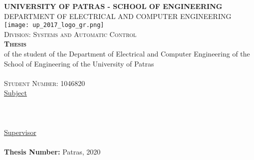 \pagestyle{empty}

\begin{titlepage}
\begin{center}
\textsc{\textbf{\large UNIVERSITY OF PATRAS - SCHOOL OF ENGINEERING}\\
\large DEPARTMENT OF ELECTRICAL AND COMPUTER ENGINEERING}\\

\texttt{[image: up\_2017\_logo\_gr.png]}\\  

\textsc{Division: \large Systems and Automatic Control}\\[1cm]

\textsc{\textbf{\LARGE{Thesis}}}\\ [0.5cm]
of the student of the Department of Electrical and Computer Engineering of the School of Engineering of the University of Patras\\[0.5cm]

\textsc{\Large \me }\\[0.5cm]
\textsc{\large Student Number: 1046820}\\[1cm]

\underline{\large Subject}\\
\HRule \\[0.4cm]
{\huge \bfseries \thesistitle }\\[0.4cm] %
\HRule \\[1.5cm]

\underline{\large Supervisor}\\[0.5cm]
\large \suptitle \, \supname \\[1cm]
\textbf{Thesis Number:}
\vfill
\large{Patras, 2020}
\end{center}
\end{titlepage}
